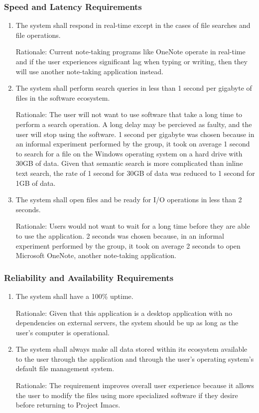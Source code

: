 \documentclass{article}
\begin{document}
\subsubsection{Speed and Latency Requirements}
\begin{enumerate}[SLR1]
    \item The system shall respond in real-time except in the cases of file searches and file operations.

	Rationale: Current note-taking programs like OneNote operate in real-time and if the user experiences significant lag when typing or writing, then they will use another note-taking application instead.
    \item The system shall perform search queries in less than 1 second per gigabyte of files in the software ecosystem.

	Rationale: The user will not want to use software that take a long time to perform a search operation. A long delay may be percieved as faulty, and the user will stop using the software. 1 second per gigabyte was chosen because in an informal experiment performed by the group, it took on average 1 second to search for a file on the Windows operating system on a hard drive with 30GB of data. Given that semantic search is more complicated than inline text search, the rate of 1 second for 30GB of data was reduced to 1 second for 1GB of data.

    \item The system shall open files and be ready for I/O operations in less than 2 seconds.

	Rationale: Users would not want to wait for a long time before they are able to use the application. 2 seconds was chosen because, in an informal experiment performed by the group, it took on average 2 seconds to open Microsoft OneNote, another note-taking application.
\end{enumerate}

\subsubsection{Reliability and Availability Requirements}
\begin{enumerate}[R{A}R1]
    \item The system shall have a 100\% uptime.

	Rationale: Given that this application is a desktop application with no dependencies on external servers, the system should be up as long as the user's computer is operational.
    \item The system shall always make all data stored within its ecosystem available to the user through the application and through the user's operating system's default file management system.

	Rationale: The requirement improves overall user experience because it allows the user to modify the files using more specialized software if they desire before returning to Project Imacs.
\end{enumerate}
\end{document}
